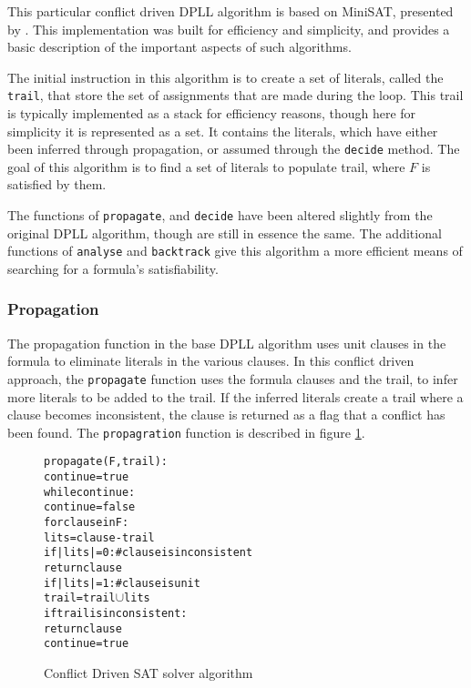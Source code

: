 This particular conflict driven DPLL algorithm is based on MiniSAT, presented by \cite{een2003}.
This implementation was built for efficiency and simplicity, and provides a basic description of the important aspects of such algorithms.

The initial instruction in this algorithm is to create a set of literals, called the \verb+trail+, that store the set of assignments that are made during the loop.
This trail is typically implemented as a stack for efficiency reasons, though here for simplicity it is represented as a set.
It contains the literals, which have either been inferred through propagation, or assumed through the \verb+decide+ method. 
The goal of this algorithm is to find a set of literals to populate trail, where $F$ is satisfied by them.

The functions of \verb+propagate+, and \verb+decide+ have been altered slightly from the original DPLL algorithm, though are still in essence the same.
The additional functions of \verb+analyse+ and \verb+backtrack+ give this algorithm a more efficient means of searching for a formula's satisfiability.

\subsubsection{Propagation}
The propagation function in the base DPLL algorithm uses unit clauses in the formula to eliminate literals in the various clauses.
In this conflict driven approach, the \verb+propagate+ function uses the formula clauses and the trail, to infer more literals to be added to the trail.
If the inferred literals create a trail where a clause becomes inconsistent, the clause is returned as a flag that a conflict has been found.
The \verb+propagration+ function is described in figure \ref{impl.conflictpropogate}.

\begin{figure}[htp]
\begin{center}
\begin{alltt}
propagate(F,trail):
    continue = true
    while continue:
        continue = false
        for clause in F:
            lits = clause - trail
            if |lits| = 0: #clause is inconsistent
                return clause
            if |lits| = 1: #clause is unit
                trail = trail \(\cup\) lits
                if trail is inconsistent:
                    return clause
                continue = true
\end{alltt}
  \caption{Conflict Driven SAT solver algorithm}
  \label{impl.conflictpropogate}
\end{center}
\end{figure}

